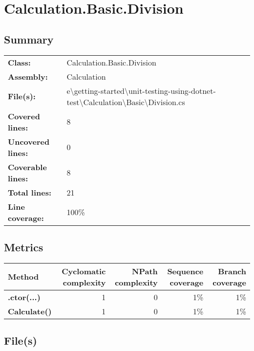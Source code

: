 \documentclass[a4paper,landscape,10pt]{article}
\begin{document}
\section{Calculation.Basic.Division}
\subsection{Summary}
\begin{longtable}[l]{ll}
\textbf{Class:} & Calculation.Basic.Division\\
\textbf{Assembly:} & Calculation\\
\textbf{File(s):} & \begin{minipage}[t]{12cm}{e\textbackslash getting-started\textbackslash unit-testing-using-dotnet-test\textbackslash Calculation\textbackslash Basic\textbackslash Division.cs}\end{minipage} \\
\textbf{Covered lines:} & 8\\
\textbf{Uncovered lines:} & 0\\
\textbf{Coverable lines:} & 8\\
\textbf{Total lines:} & 21\\
\textbf{Line coverage:} & 100\%\\
\end{longtable}
\subsection{Metrics}
\begin{longtable}[l]{|l|r|r|r|r|}
\hline
\textbf{Method} & \textbf{Cyclomatic complexity} & \textbf{NPath complexity} & \textbf{Sequence coverage} & \textbf{Branch coverage}\\
\hline
\textbf{.ctor(...)} & 1 & 0 & 1\% & 1\%\\
\hline
\textbf{Calculate()} & 1 & 0 & 1\% & 1\%\\
\hline
\end{longtable}
\subsection{File(s)}
\end{document}
